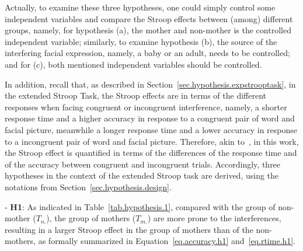 Actually, to examine these three hypotheses, 
one could simply control some independent variables and compare the Stroop effects between (among) different groups,
namely, for hypothesis (a), the mother and non-mother is the controlled independent 
variable; similarly, to examine hypothesis (b), the source of the interfering facial expression,
namely, a baby or an adult, needs to be controlled; and for (c),
both mentioned independent variables should be controlled.

In addition,
recall that, as described in Section~\ref{sec.hypothesis.expstrooptask},
in the extended Stroop Task, the Stroop effects are 
in terms of the different responses when facing congruent or incongruent interference,
namely, 
a shorter response time and a higher accuracy 
in response to a congruent pair of word and facial picture, meanwhile a longer response time and a lower accuracy 
in response to a incongruent pair of word and facial picture.
Therefore, akin to~\citep{bugg2008multiple}, in this work,
the Stroop effect is quantified in terms of the differences 
of the response time and of the accuracy between congruent and incongruent trials.
Accordingly, three hypotheses in the context of the extended Stroop task are derived, using the notations
from Section~\ref{sec.hypothesis.design}.
\begin{table}[!t]
\centering
{}
\caption{Subsets defined for hypothesis 1. }
\end{table}
 
\noindent - \textbf{H1}:
As indicated in Table~\ref{tab.hypothesis.1}, 
compared with the group of non-mother ($T_{n.}$), 
the group of mothers ($T_{m.}$) are more prone to the interferences, resulting in a larger Stroop effect in the group of mothers than of the non-mothers, as formally summarized in Equation~\ref{eq.accuracy.h1} and~\ref{eq.rtime.h1}.

